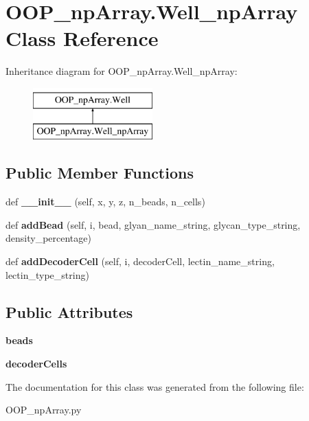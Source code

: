 \hypertarget{class_o_o_p__np_array_1_1_well__np_array}{}\section{O\+O\+P\+\_\+np\+Array.\+Well\+\_\+np\+Array Class Reference}
\label{class_o_o_p__np_array_1_1_well__np_array}
Inheritance diagram for O\+O\+P\+\_\+np\+Array.\+Well\+\_\+np\+Array\+:\begin{figure}[H]
\begin{center}
\leavevmode
\includegraphics[height=2.000000cm]{class_o_o_p__np_array_1_1_well__np_array}
\end{center}
\end{figure}
\subsection*{Public Member Functions}
\begin{DoxyCompactItemize}
\item 
\mbox{\label{class_o_o_p__np_array_1_1_well__np_array_a444855f0c55c0420a6ef5d5c0ac3214a}} 
def {\bfseries \+\_\+\+\_\+init\+\_\+\+\_\+} (self, x, y, z, n\+\_\+beads, n\+\_\+cells)
\item 
\mbox{\label{class_o_o_p__np_array_1_1_well__np_array_a2a7090962b7123e4400fa3343e0c1289}} 
def {\bfseries add\+Bead} (self, i, bead, glyan\+\_\+name\+\_\+string, glycan\+\_\+type\+\_\+string, density\+\_\+percentage)
\item 
\mbox{\label{class_o_o_p__np_array_1_1_well__np_array_a736fded2de7a8996ddceb86a38ee6fa4}} 
def {\bfseries add\+Decoder\+Cell} (self, i, decoder\+Cell, lectin\+\_\+name\+\_\+string, lectin\+\_\+type\+\_\+string)
\end{DoxyCompactItemize}
\subsection*{Public Attributes}
\begin{DoxyCompactItemize}
\item 
\mbox{\label{class_o_o_p__np_array_1_1_well__np_array_a9a8c256bed5cd50e3e5670c1f8d430a2}} 
{\bfseries beads}
\item 
\mbox{\label{class_o_o_p__np_array_1_1_well__np_array_ab6c127c23c6e613f7d32242742970a2f}} 
{\bfseries decoder\+Cells}
\end{DoxyCompactItemize}


The documentation for this class was generated from the following file\+:\begin{DoxyCompactItemize}
\item 
O\+O\+P\+\_\+np\+Array.\+py\end{DoxyCompactItemize}
